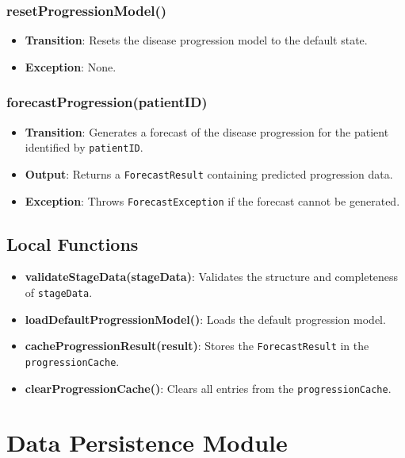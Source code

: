 \documentclass[12pt, titlepage]{article}
\begin{document}
\subsubsection{resetProgressionModel()}
\begin{itemize}
    \item \textbf{Transition}: Resets the disease progression model to the default state.
    \item \textbf{Exception}: None.
\end{itemize}

\subsubsection{forecastProgression(patientID)}
\begin{itemize}
    \item \textbf{Transition}: Generates a forecast of the disease progression for the patient identified by \texttt{patientID}.
    \item \textbf{Output}: Returns a \texttt{ForecastResult} containing predicted progression data.
    \item \textbf{Exception}: Throws \texttt{ForecastException} if the forecast cannot be generated.
\end{itemize}

\subsection{Local Functions}
\begin{itemize}
    \item \textbf{validateStageData(stageData)}: Validates the structure and completeness of \texttt{stageData}.
    \item \textbf{loadDefaultProgressionModel()}: Loads the default progression model.
    \item \textbf{cacheProgressionResult(result)}: Stores the \texttt{ForecastResult} in the \texttt{progressionCache}.
    \item \textbf{clearProgressionCache()}: Clears all entries from the \texttt{progressionCache}.
\end{itemize}

\section{Data Persistence Module}
\label{Data Persistence Module}
\end{document}
